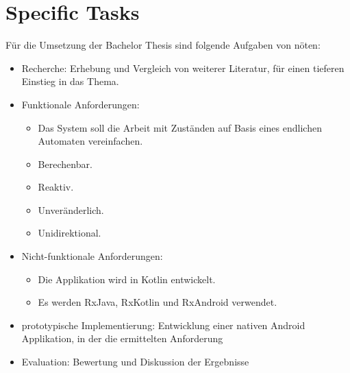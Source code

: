 \section{Specific Tasks}
\label{sec:specific-tasks}

Für die Umsetzung der Bachelor Thesis sind folgende Aufgaben von nöten:
%
\begin{itemize}
    \item Recherche: Erhebung und Vergleich von weiterer Literatur, für einen tieferen Einstieg in das Thema.
    \item Funktionale Anforderungen: 
        \begin{itemize}
            \item Das System soll die Arbeit mit Zuständen auf Basis eines endlichen Automaten vereinfachen.
            \item Berechenbar.
            \item Reaktiv.
            \item Unveränderlich.
            \item Unidirektional.
        \end{itemize}
    \item Nicht-funktionale Anforderungen:
    \begin{itemize}
        \item Die Applikation wird in Kotlin entwickelt.
        \item Es werden RxJava, RxKotlin und RxAndroid verwendet.
    \end{itemize}
    \item prototypische Implementierung: Entwicklung einer nativen Android Applikation, in der 
    die ermittelten Anforderung 
    \item Evaluation: Bewertung und Diskussion der Ergebnisse
\end{itemize}